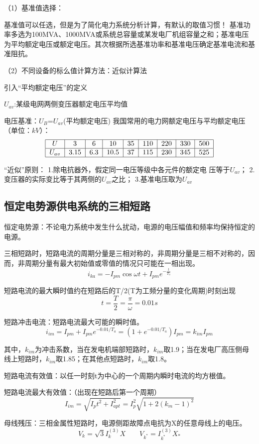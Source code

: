 \documentclass[UTF8, 12pt, a4paper]{ctexart}
\begin{document}
（1）基准值选择：

基准值可以任选，但是为了简化电力系统分析计算，有默认的取值习惯！
基准功率多选为100MVA、1000MVA或系统总容量或某发电厂机组容量之和；基准电压为平均额定电压或额定电压。其次根据所选基准功率和基准电压确定基准电流和基准阻抗。

（2）不同设备的标么值计算方法：近似计算法

引入“平均额定电压”的定义

$U_{av}$:某级电网两侧变压器额定电压平均值

电压基准：$U_B$=$U_{av}$(平均额定电压)
我国常用的电力网额定电压与平均额定电压（单位：$kV$）：
\[
    \begin{tabular}{ |c |c |c|c|c|c|c|c|c| }
        \hline
        $U$&3&6&10&35&110&220&330&500\\
        \hline
        $U_{av}$&3.15&6.3&10.5&37&115&230&345&525\\
        \hline
    \end{tabular}
\]

“近似”原则：
1.除电抗器外，假定同一电压等级中各元件的额定电 压等于$U_{av}$；
2.变压器的实际变比等于其两侧的$U_{av}$之比； 
3.基准电压取为$U_{av}$
\subsection{恒定电势源供电系统的三相短路}
恒定电势源：不论电力系统中发生什么扰动，电源的电压幅值和频率均保持恒定的电源。

三相短路时，短路电流的周期分量是三相对称的，非周期分量是三相不对称的，因而，非周期分量有最大初始值或零值的情况只可能在一相出现。
\[i _ { k a } = - I _ { p m } \operatorname { cos } \omega t + I _ { p m } e ^ { - \frac { t } { T _ { a } } }\]

短路电流的最大瞬时值约在短路后的T/2(T为工频分量的变化周期)时刻出现
\[t = \frac { T } { 2 } = \frac { \pi } { \omega } = 0.01 s\]

短路冲击电流：短路电流最大可能的瞬时值。
\[
    i_{im}=I_{pm}+I_{pm}e^{-0.01/T_a}=(1+e^{-{0.01/T_a}})I_{pm}=k_{im}I_{pm}
\]

其中，$k_{im}$为冲击系数，当在发电机端部短路时，$k_{im}$取1.9；当在发电厂高压侧母线上短路时，$k_{im}$取1.85；在其他点短路时，$k_{im}$取1.8。

短路电流有效值：以任一时刻t为中心的一个周期内瞬时电流的均方根值。

短路电流最大有效值：（出现在短路后第一个周期）
\[I_{im}=\sqrt{I_pt^2+I_{apt}^2}=I_p^2\sqrt{1+2(k_m-1)^2}\]

母线残压：三相金属性短路时，电源侧距故障点电抗为X的任意母线上的电压。
\[V_k=\sqrt{3}I_k^{(3)}X \qquad V_{k^*}=I^{(3)}_{k^*}X_*\]
\end{document}
